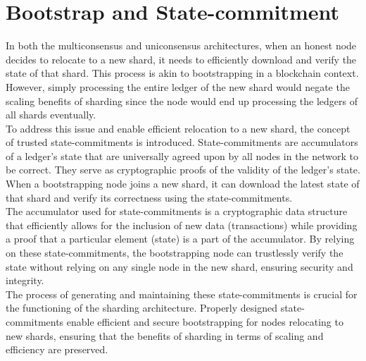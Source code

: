 \section{ Bootstrap and State-commitment}
In both the multiconsensus and uniconsensus architectures, when an honest node decides to relocate to a new shard, it needs to efficiently download and verify the state of that shard. This process is akin to bootstrapping in a blockchain context. However, simply processing the entire ledger of the new shard would negate the scaling benefits of sharding since the node would end up processing the ledgers of all shards eventually.\\
To address this issue and enable efficient relocation to a new shard, the concept of trusted state-commitments is introduced. State-commitments are accumulators of a ledger's state that are universally agreed upon by all nodes in the network to be correct. They serve as cryptographic proofs of the validity of the ledger's state. When a bootstrapping node joins a new shard, it can download the latest state of that shard and verify its correctness using the state-commitments.\\
The accumulator used for state-commitments is a cryptographic data structure that efficiently allows for the inclusion of new data (transactions) while providing a proof that a particular element (state) is a part of the accumulator. By relying on these state-commitments, the bootstrapping node can trustlessly verify the state without relying on any single node in the new shard, ensuring security and integrity.\\
The process of generating and maintaining these state-commitments is crucial for the functioning of the sharding architecture. Properly designed state-commitments enable efficient and secure bootstrapping for nodes relocating to new shards, ensuring that the benefits of sharding in terms of scaling and efficiency are preserved.
